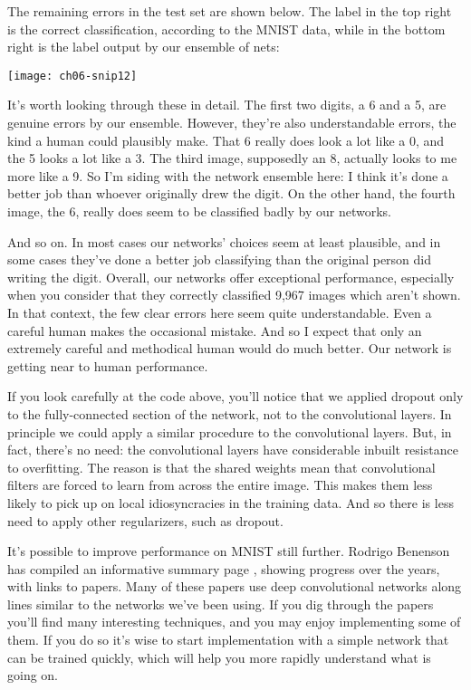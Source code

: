 The remaining errors in the test set are shown below. The label in the top right is the correct classification, according to the MNIST data, while in the bottom right is the label output by our ensemble of nets:

\begin{figure*}[tph]
\texttt{[image: ch06-snip12]}
\end{figure*}


It's worth looking through these in detail. The first two digits, a 6 and a 5, are genuine errors by our ensemble. However, they're also understandable errors, the kind a human could plausibly make. That 6 really does look a lot like a 0, and the 5 looks a lot like a 3. The third image, supposedly an 8, actually looks to me more like a 9. So I'm siding with the network ensemble here: I think it's done a better job than whoever originally drew the digit. On the other hand, the fourth image, the 6, really does seem to be classified badly by our networks.

And so on. In most cases our networks' choices seem at least plausible, and in some cases they've done a better job classifying than the original person did writing the digit. Overall, our networks offer exceptional performance, especially when you consider that they correctly classified 9,967 images which aren't shown. In that context, the few clear errors here seem quite understandable. Even a careful human makes the occasional mistake. And so I expect that only an extremely careful and methodical human would do much better. Our network is getting near to human performance.

 If you look carefully at the code above, you'll notice that we applied dropout only to the fully-connected section of the network, not to the convolutional layers. In principle we could apply a similar procedure to the convolutional layers. But, in fact, there's no need: the convolutional layers have considerable inbuilt resistance to overfitting. The reason is that the shared weights mean that convolutional filters are forced to learn from across the entire image. This makes them less likely to pick up on local idiosyncracies in the training data. And so there is less need to apply other regularizers, such as dropout.

 It's possible to improve performance on MNIST still further. Rodrigo Benenson has compiled an informative summary page \cite{Benenson2019}, showing progress over the years, with links to papers. Many of these papers use deep convolutional networks along lines similar to the networks we've been using. If you dig through the papers you'll find many interesting techniques, and you may enjoy implementing some of them. If you do so it's wise to start implementation with a simple network that can be trained quickly, which will help you more rapidly understand what is going on.

